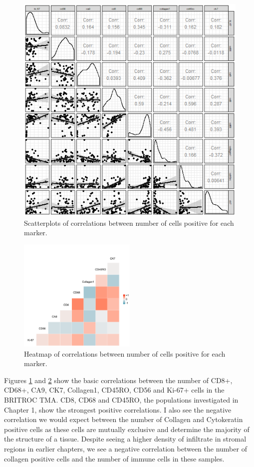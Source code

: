 \begin{figure}
    \centering
    \includegraphics{Chapter4/figs/Britroc_cell_correlation2.png}
    \caption{Scatterplots of correlations between number of cells positive for each marker.}
    \label{fig:britroc_corr_scatt}
\end{figure}

\begin{figure}
    \centering
    \includegraphics[width=0.5\textwidth]{Chapter2/Figs/Raster/correlation_britroc.png}
    \caption{Heatmap of correlations between number of cells positive for each marker.}
    \label{fig:britroc_corr_heat}
\end{figure}

Figures \ref{fig:britroc_corr_scatt} and \ref{fig:britroc_corr_heat} show the basic correlations between the number of CD8+, CD68+, CA9, CK7, Collagen1, CD45RO, CD56 and Ki-67+ cells in the BRITROC TMA. CD8, CD68 and CD45RO, the populations investigated in Chapter 1, show the strongest positive correlations. I also see the negative correlation we would expect between the number of Collagen and Cytokeratin positive cells as these cells are mutually exclusive and determine the majority of the structure of a tissue. Despite seeing a higher density of infiltrate in stromal regions in earlier chapters, we see a negative correlation between the number of collagen positive cells and the number of immune cells in these samples.


